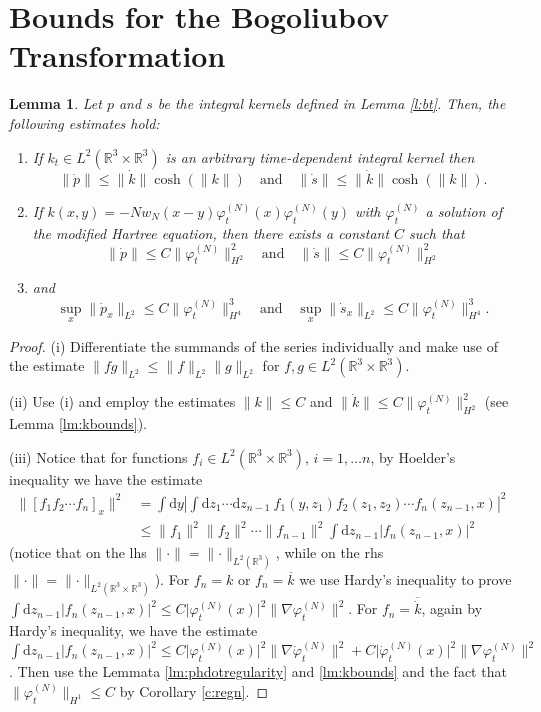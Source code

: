 \documentclass[11pt,a4paper,draft,DIV11]{scrartcl}	%
\newtheorem{lem}[thm]{Lemma}
\newcommand{\di}{\textrm{d}}		%
\newcommand{\cc}[1]{\overline{#1}}	%
\newcommand{\Rbb}{\mathbb{R}}		%
\newcommand{\norm}[1]{\lVert#1\rVert}	%
\newcommand{\ph}{\varphi_t^{(N)}}	%
\newcommand{\phdot}{\dot{\varphi}_t^{(N)}}	%
\newcommand{\bd}{\begin{displaymath}}			%
\newcommand{\ed}{\end{displaymath}}
\begin{document}
\section{Bounds for the Bogoliubov Transformation}
\begin{lem}
\label{lem:dottedests1}
Let $p$ and $s$ be the integral kernels defined in Lemma \ref{l:bt}. Then, the following estimates hold:
\begin{enumerate}
\item If $k_t \in L^2(\Rbb^3\times\Rbb^3)$ is an arbitrary time-dependent integral kernel then
\bd
\norm{\dot p} \leq \norm{\dot k} \cosh(\norm{k}) \quad \mbox{and} \quad \norm{\dot s} \leq \norm{\dot k} \cosh(\norm{k}).
\ed
\item If $k(x,y) = - N w_N(x-y) \ph(x) \ph(y)$ with $\ph$ a solution of the modified Hartree equation, then there exists a constant $C$ such that
\bd
\norm{\dot p} \leq C \norm{\ph}_{H^2}^2 \quad \mbox{and} \quad \norm{\dot s} \leq C \norm{\ph}_{H^2}^2
\ed
\item
and
\bd
\sup_x \norm{\dot p_x}_{L^2} \leq C \norm{\ph}_{H^4}^3 \quad \mbox{and} \quad \sup_x \norm{\dot s_x}_{L^2} \leq C \norm{\ph}_{H^4}^3.
\ed
\end{enumerate}
\end{lem}
\begin{proof} (i) Differentiate the summands of the series individually and make use of the estimate $\norm{fg}_{L^2} \leq \norm{f}_{L^2} \norm{g}_{L^2}$ for $f,g \in L^2(\Rbb^3\times \Rbb^3)$.

(ii) Use (i) and employ the estimates $\norm{k} \leq C$ and $\norm{\dot k} \leq C \norm{\ph}_{H^2}^2$ (see Lemma \ref{lm:kbounds}).

(iii) Notice that for functions $f_i \in L^2(\Rbb^3 \times \Rbb^3)$, $i=1,\dots n$, by Hoelder's inequality we have the estimate
\begin{align*}
\norm{\left[ f_1 f_2 \cdots f_n\right]_x}^2 & = \int \di y \left\lvert \int \di z_1 \cdots \di z_{n-1}\ f_1(y,z_1) f_2(z_1,z_2) \cdots f_n(z_{n-1},x) \right\rvert^2 \\
& \leq \norm{f_1}^2 \norm{f_2}^2 \cdots \norm{f_{n-1}}^2 \int \di z_{n-1} \lvert f_n(z_{n-1},x) \rvert^2 
\end{align*}
(notice that on the lhs $\norm{\cdot}= \norm{\cdot}_{L^2(\Rbb^3)}$, while on the rhs $\norm{\cdot} = \norm{\cdot}_{L^2(\Rbb^3\times\Rbb^3)}$).
For $f_n = k$ or $f_n = \cc{k}$ we use Hardy's inequality to prove $\int \di z_{n-1} \lvert f_n(z_{n-1},x) \rvert^2 \leq C \lvert \ph(x) \rvert^2 \norm{\nabla \ph}^2$. For $f_n = \cc{\dot k}$, again by Hardy's inequality, we have the estimate $\int \di z_{n-1} \lvert f_n(z_{n-1},x) \rvert^2 \leq C\lvert \ph(x)\rvert^2 \norm{\nabla \phdot}^2 + C \lvert \phdot(x)\rvert^2 \norm{\nabla \ph}^2$. Then use the Lemmata \ref{lm:phdotregularity} and \ref{lm:kbounds} and the fact that $\norm{\ph}_{H^1} \leq C$ by Corollary \ref{c:regn}.
\end{proof}
\end{document}
